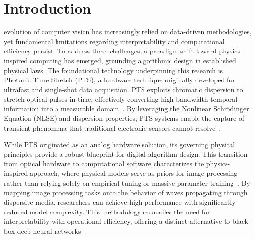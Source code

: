 \documentclass[journal,transmag]{IEEEtran}
\begin{document}
\maketitle
\IEEEdisplaynontitleabstractindextext

\section{Introduction}
 evolution of computer vision has increasingly relied on data-driven methodologies, yet fundamental limitations regarding interpretability and computational efficiency persist. To address these challenges, a paradigm shift toward physics-inspired computing has emerged, grounding algorithmic design in established physical laws. The foundational technology underpinning this research is Photonic Time Stretch (PTS), a hardware technique originally developed for ultrafast and single-shot data acquisition. PTS exploits chromatic dispersion to stretch optical pulses in time, effectively converting high-bandwidth temporal information into a measurable domain~\cite{mahjoubfar2017time}. By leveraging the Nonlinear Schrödinger Equation (NLSE) and dispersion properties, PTS systems enable the capture of transient phenomena that traditional electronic sensors cannot resolve~\cite{zhou2022unified}.

While PTS originated as an analog hardware solution, its governing physical principles provide a robust blueprint for digital algorithm design. This transition from optical hardware to computational software characterizes the physics-inspired approach, where physical models serve as priors for image processing rather than relying solely on empirical tuning or massive parameter training~\cite{jalali2019empowering}. By mapping image processing tasks onto the behavior of waves propagating through dispersive media, researchers can achieve high performance with significantly reduced model complexity. This methodology reconciles the need for interpretability with operational efficiency, offering a distinct alternative to black-box deep neural networks~\cite{zhou2023phycv}.
\end{document}
